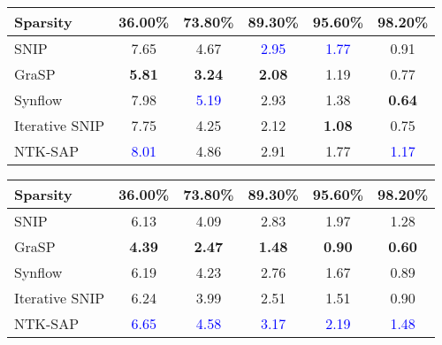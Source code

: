 \begin{table*}[h!]

    \begin{center}
    \caption{Total pruning + training FLOPs ($\times 10^{14}$) comparison on CIFAR-10(ResNet-20). Results with the largest FLOPs are in \textcolor{blue}{blue} and results with the smallest FLOPs are in \textbf{bold}.}     \label{tab:appendix-flops-total-cifar10}
    {
    \begin{tabular}{l ccccc}
    \\
    \hline
    \toprule
    Sparsity & 36.00\% & 73.80\% & 89.30\% & 95.60\% & 98.20\% \\
    \midrule
    SNIP & 7.65 & 4.67 & \textcolor{blue}{2.95} & \textcolor{blue}{1.77} & 0.91  \\
    GraSP & \textbf{5.81} & \textbf{3.24} & \textbf{2.08} & 1.19 & 0.77 \\
    Synflow & 7.98 & \textcolor{blue}{5.19} & 2.93 & 1.38 & \textbf{0.64}  \\
    Iterative SNIP & 7.75 & 4.25 & 2.12 & \textbf{1.08} & 0.75 \\
    NTK-SAP & \textcolor{blue}{8.01} & 4.86 & 2.91 & 1.77 & \textcolor{blue}{1.17} \\

    \bottomrule
    \end{tabular}
    }
    
    \end{center}
        \begin{center}
    \caption{Total pruning + training FLOPs ($\times 10^{15}$) comparison on CIFAR-100(VGG-16). Results with the largest FLOPs are in \textcolor{blue}{blue} and results with the smallest FLOPs are in \textbf{bold}.}     \label{tab:appendix-flops-total-cifar100}
    {
    \begin{tabular}{l ccccc}
    \\
    \hline
    \toprule
    Sparsity & 36.00\% & 73.80\% & 89.30\% & 95.60\% & 98.20\% \\
    \midrule
    SNIP & 6.13 & 4.09 & 2.83 & 1.97 & 1.28 \\
    GraSP & \textbf{4.39} & \textbf{2.47} & \textbf{1.48} & \textbf{0.90} & \textbf{0.60} \\
    Synflow & 6.19 & 4.23 & 2.76 & 1.67 & 0.89 \\
    Iterative SNIP & 6.24 & 3.99 & 2.51 & 1.51 & 0.90 \\
    NTK-SAP & \textcolor{blue}{6.65} & \textcolor{blue}{4.58} & \textcolor{blue}{3.17} & \textcolor{blue}{2.19} & \textcolor{blue}{1.48} \\


\end{tabular}}
\end{center}
\end{table*}
